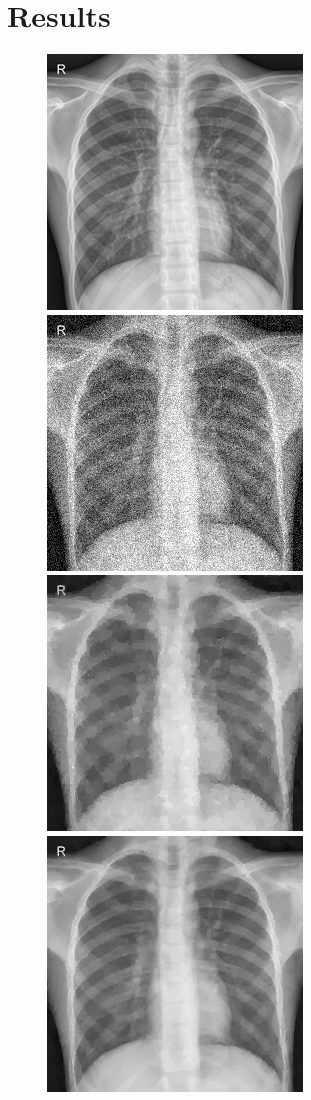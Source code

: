\documentclass[12pt]{article}
\begin{document}



\section{Results}

\begin{figure}[H]
  \centering
  \includegraphics[width=0.34\linewidth]{images//chest_xray/ex_2/clean.png}
  \includegraphics[width=0.34\linewidth]{images//chest_xray/ex_2/noisy.png}
  \includegraphics[width=0.34\linewidth]{images//chest_xray/ex_2/psnr_29.945-lambda_0.07.png}
  \includegraphics[width=0.34\linewidth]{images//chest_xray/ex_2/denoised-mse_49.17-psnr_31.248-ssim_0.831.png}

\end{figure}
\end{document}
